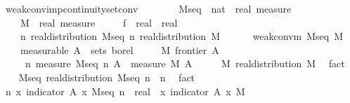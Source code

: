 \documentclass{article}
\theoremstyle{definition}
\begin{document}
\begin{isabellebody}
\isamarkupfalse%
\ weak{\isacharunderscore}conv{\isacharunderscore}imp{\isacharunderscore}continuity{\isacharunderscore}set{\isacharunderscore}conv{\isacharcolon}\isanewline
\ \ \ \isanewline
\ \ \ \ M{\isacharunderscore}seq\ {\isacharcolon}{\isacharcolon}\ {\isachardoublequoteopen}nat\ {\isasymRightarrow}\ real\ measure{\isachardoublequoteclose}\ \isanewline
\ \ \ \ M\ {\isacharcolon}{\isacharcolon}\ {\isachardoublequoteopen}real\ measure{\isachardoublequoteclose}\ \isanewline
\ \ \ \ f\ {\isacharcolon}{\isacharcolon}\ {\isachardoublequoteopen}real\ {\isasymRightarrow}\ real{\isachardoublequoteclose}\isanewline
\ \ \ \isanewline
\ \ \ \ {\isachardoublequoteopen}{\isasymAnd}n{\isachardot}\ real{\isacharunderscore}distribution\ {\isacharparenleft}M{\isacharunderscore}seq\ n{\isacharparenright}{\isachardoublequoteclose}\ {\isachardoublequoteopen}real{\isacharunderscore}distribution\ M{\isachardoublequoteclose}\ \ \isanewline
\ \ \ \ {\isachardoublequoteopen}weak{\isacharunderscore}conv{\isacharunderscore}m\ M{\isacharunderscore}seq\ M{\isachardoublequoteclose}\ \isanewline
\ \ \ \ {\isacharbrackleft}measurable{\isacharbrackright}{\isacharcolon}\ {\isachardoublequoteopen}A\ {\isasymin}\ sets\ borel{\isachardoublequoteclose}\ \isanewline
\ \ \ \ {\isachardoublequoteopen}M\ {\isacharparenleft}frontier\ A{\isacharparenright}\ {\isacharequal}\ {}{\isachardoublequoteclose}\isanewline
\ \ \ \isanewline
\ \ \ \ {\isachardoublequoteopen}{\isacharparenleft}{\isasymlambda}\ n{\isachardot}\ {\isacharparenleft}measure\ {\isacharparenleft}M{\isacharunderscore}seq\ n{\isacharparenright}\ A{\isacharparenright}{\isacharparenright}\ {\isacharminus}{\isacharminus}{\isacharminus}{\isacharminus}{\isachargreater}\ measure\ M\ A{\isachardoublequoteclose}\isanewline
{}\isamarkupfalse%
\ {\isacharminus}\isanewline
\ \ \isamarkupfalse%
\ M{\isacharcolon}\ real{\isacharunderscore}distribution\ M\ \isamarkupfalse%
\ fact\isanewline
\ \ \isamarkupfalse%
\ M{\isacharunderscore}seq{\isacharcolon}\ real{\isacharunderscore}distribution\ {\isachardoublequoteopen}M{\isacharunderscore}seq\ n{\isachardoublequoteclose}\ \ n\ \isamarkupfalse%
\ fact\isanewline
\ \ \isanewline
\ \ \isamarkupfalse%
\ {\isachardoublequoteopen}{\isacharparenleft}{\isasymlambda}n{\isachardot}\ {\isacharparenleft}{\isasymintegral}x{\isachardot}\ indicator\ A\ x\ {\isasympartial}M{\isacharunderscore}seq\ n{\isacharparenright}\ {\isacharcolon}{\isacharcolon}\ real{\isacharparenright}\ {\isacharminus}{\isacharminus}{\isacharminus}{\isacharminus}{\isachargreater}\ {\isacharparenleft}{\isasymintegral}x{\isachardot}\ indicator\ A\ x\ {\isasympartial}M{\isacharparenright}{\isachardoublequoteclose}\isanewline

\end{isabellebody}
\end{document}
